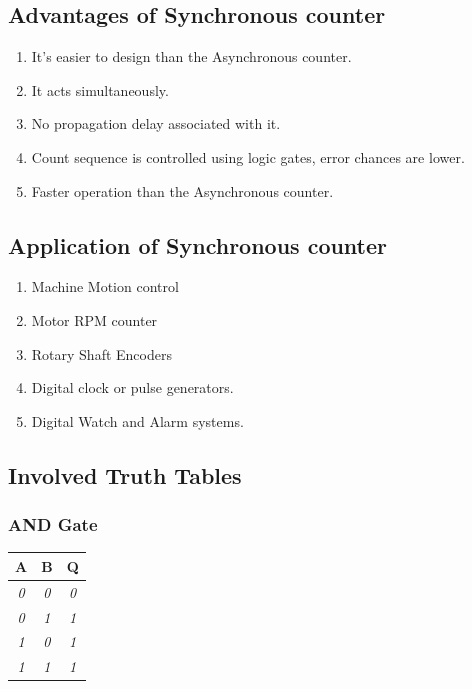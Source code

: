 \documentclass[11pt]{article}
\begin{document}
\subsection{Advantages of Synchronous counter}

\begin{enumerate}
	\item It’s easier to design than the Asynchronous counter.
	\item It acts simultaneously.
	\item No propagation delay associated with it.
	\item Count sequence is controlled using logic gates, error chances are lower.
	\item Faster operation than the Asynchronous counter.
\end{enumerate}

\subsection{Application of Synchronous counter}
\begin{enumerate}
	\item Machine Motion control
	\item Motor RPM counter
	\item Rotary Shaft Encoders
	\item Digital clock or pulse generators.
	\item Digital Watch and Alarm systems.
\end{enumerate}

\subsection{Involved Truth Tables}

\subsubsection{AND Gate}

\begin{table}[H]
	\begin{tabular}{|c|c|c|}
		\hline
		{\color[HTML]{000000} \textbf{A}} & {\color[HTML]{000000} \textbf{B}} & {\color[HTML]{000000} \textbf{Q}} \\ \hline
		{\color[HTML]{330001} \textit{0}} & {\color[HTML]{330001} \textit{0}} & {\color[HTML]{F56B00} \textit{0}} \\ \hline
		{\color[HTML]{330001} \textit{0}} & {\color[HTML]{330001} \textit{1}} & {\color[HTML]{F56B00} \textit{1}} \\ \hline
		{\color[HTML]{330001} \textit{1}} & {\color[HTML]{330001} \textit{0}} & {\color[HTML]{F56B00} \textit{1}} \\ \hline
		{\color[HTML]{330001} \textit{1}} & {\color[HTML]{330001} \textit{1}} & {\color[HTML]{F56B00} \textit{1}} \\ \hline
	\end{tabular}
\end{table}
\end{document}
